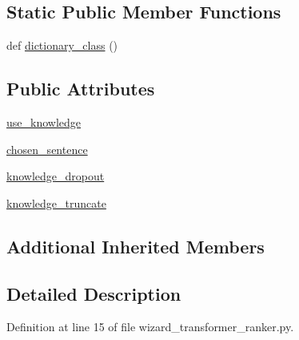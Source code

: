 \subsection*{Static Public Member Functions}
\begin{DoxyCompactItemize}
\item 
def \hyperlink{classprojects_1_1wizard__of__wikipedia_1_1wizard__transformer__ranker_1_1wizard__transformer__rad02f16524e5e0423aa3e2c69e1330ee1_a8e688fde0db811587679f5625ffdfb58}{dictionary\+\_\+class} ()
\end{DoxyCompactItemize}
\subsection*{Public Attributes}
\begin{DoxyCompactItemize}
\item 
\hyperlink{classprojects_1_1wizard__of__wikipedia_1_1wizard__transformer__ranker_1_1wizard__transformer__rad02f16524e5e0423aa3e2c69e1330ee1_a68ec02a7c1591b009ce87c0348fcad89}{use\+\_\+knowledge}
\item 
\hyperlink{classprojects_1_1wizard__of__wikipedia_1_1wizard__transformer__ranker_1_1wizard__transformer__rad02f16524e5e0423aa3e2c69e1330ee1_a51528c58413bd74f30fe8e728b919656}{chosen\+\_\+sentence}
\item 
\hyperlink{classprojects_1_1wizard__of__wikipedia_1_1wizard__transformer__ranker_1_1wizard__transformer__rad02f16524e5e0423aa3e2c69e1330ee1_ab5a2b64c750bc73f0aa8c39bc0ce1c28}{knowledge\+\_\+dropout}
\item 
\hyperlink{classprojects_1_1wizard__of__wikipedia_1_1wizard__transformer__ranker_1_1wizard__transformer__rad02f16524e5e0423aa3e2c69e1330ee1_a90a27dc83c6dd64cd1f1548617117f8e}{knowledge\+\_\+truncate}
\end{DoxyCompactItemize}
\subsection*{Additional Inherited Members}


\subsection{Detailed Description}


Definition at line 15 of file wizard\+\_\+transformer\+\_\+ranker.\+py.



